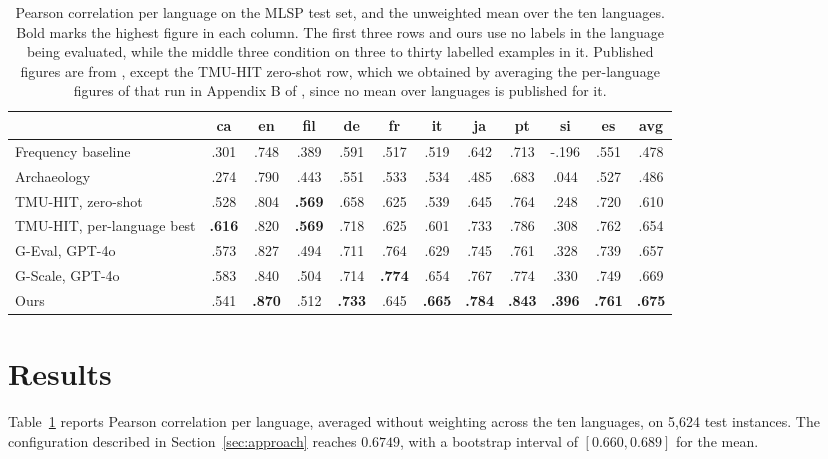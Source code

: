 \begin{table}[t]
\centering
\small
\begin{tabular}{lccccccccccc}
\toprule
& ca & en & fil & de & fr & it & ja & pt & si & es & avg \\
\midrule
Frequency baseline         & .301 & .748 & .389 & .591 & .517 & .519 & .642 & .713 & -.196 & .551 & .478 \\
Archaeology                & .274 & .790 & .443 & .551 & .533 & .534 & .485 & .683 & .044 & .527 & .486 \\
TMU-HIT, zero-shot         & .528 & .804 & \textbf{.569} & .658 & .625 & .539 & .645 & .764 & .248 & .720 & .610 \\
\midrule
TMU-HIT, per-language best & \textbf{.616} & .820 & \textbf{.569} & .718 & .625 & .601 & .733 & .786 & .308 & .762 & .654 \\
G-Eval, GPT-4o             & .573 & .827 & .494 & .711 & .764 & .629 & .745 & .761 & .328 & .739 & .657 \\
G-Scale, GPT-4o            & .583 & .840 & .504 & .714 & \textbf{.774} & .654 & .767 & .774 & .330 & .749 & .669 \\
\midrule
Ours                       & .541 & \textbf{.870} & .512 & \textbf{.733} & .645 & \textbf{.665} & \textbf{.784} & \textbf{.843} & \textbf{.396} & \textbf{.761} & \textbf{.675} \\
\bottomrule
\end{tabular}
\caption{Pearson correlation per language on the MLSP test set, and the
unweighted mean over the ten languages. Bold marks the highest figure in
each column. The first three rows and ours use no labels in the language
being evaluated, while the middle three condition on three to thirty
labelled examples in it. Published figures are from
\citet{nohejl-etal-2025-japanese}, except the TMU-HIT zero-shot row,
which we obtained by averaging the per-language figures of that run in
Appendix B of \citet{shardlow-etal-2024-bea}, since no mean over
languages is published for it.}
\label{tab:results}
\end{table}

\section{Results}
\label{sec:results}

Table~\ref{tab:results} reports Pearson correlation per language,
averaged without weighting across the ten languages, on 5{,}624 test
instances. The configuration described in Section~\ref{sec:approach}
reaches $0.6749$, with a bootstrap interval of $[0.660, 0.689]$ for the
mean.

